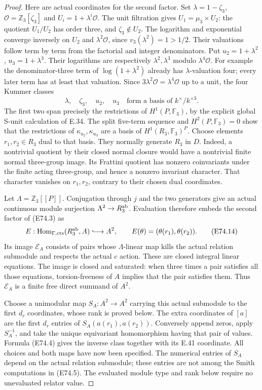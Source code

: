 \begin{proof}
Here are actual coordinates for the second factor.
Set $\lambda=1-\zeta_3$, $\mathcal O=\mathbb Z_3[\zeta_3]$
and $U_i=1+\lambda^i\mathcal O$. The unit filtration gives
$U_1=\mu_3\times U_2$: the quotient $U_1/U_2$ has order
three, and $\zeta_3\notin U_2$. The logarithm and
exponential converge inversely on $U_2$ and
$\lambda^2\mathcal O$, since $v_3(\lambda^2)=1>1/2$.
Their valuations follow term by term from the factorial
and integer denominators. Put $u_2=1+\lambda^2$,
$u_3=1+\lambda^3$. Their logarithms are respectively
$\lambda^2,\lambda^3$ modulo $\lambda^4\mathcal O$.
For example the denominator-three term of
$\log(1+\lambda^2)$ already has $\lambda$-valuation
four; every later term has at least that valuation.
Since $3\lambda^2\mathcal O=\lambda^4\mathcal O$ up
to a unit, the four Kummer classes
\[
 \lambda,\quad\zeta_3,\quad u_2,\quad u_3
 \quad\text{form a basis of }k^\times/k^{\times3}.
 \tag{E74.13}
\]
The first two span precisely the restrictions of
$H^1(P,\mathbb F_3)$, by the explicit global S-unit
calculation of E.34. The split five-term sequence and
$H^2(P,\mathbb F_3)=0$ show that the restrictions of
$\kappa_{u_2},\kappa_{u_3}$ are a basis of
$H^1(R_3,\mathbb F_3)^P$. Choose elements $r_1,r_2\in R_3$
dual to that basis. They normally generate $R_3$ in $D$.
Indeed, a nontrivial quotient by their closed normal
closure would have a nontrivial finite normal three-group
image. Its Frattini quotient has nonzero coinvariants
under the finite acting three-group, and hence a nonzero
invariant character. That character vanishes on $r_1,r_2$,
contrary to their chosen dual coordinates.

Let $\Lambda=\mathbb Z_3[[P]]$. Conjugation through $j$
and the two generators give an actual continuous module
surjection $\Lambda^2\to R_3^{\rm ab}$. Evaluation
therefore embeds the second factor of (E74.3) as
\[
 E:\operatorname{Hom}_{\Gamma,\rm cts}(R_3^{\rm ab},A)
       \lhook\joinrel\longrightarrow A^2,
 \qquad E(\theta)=(\theta(r_1),\theta(r_2)).
 \tag{E74.14}
\]
Its image $\mathcal E_A$ consists of pairs whose
$\Lambda$-linear map kills the actual relation submodule
and respects the actual $c$ action. These are closed
integral linear equations. The image is closed and
saturated: when three times a pair satisfies all those
equations, torsion-freeness of $A$ implies that the pair
satisfies them. Thus $\mathcal E_A$ is a finite free
direct summand of $A^2$.

Choose a unimodular map $S_A:A^2\to A^2$ carrying this
actual submodule to the first $d_r$ coordinates, whose
rank is proved below. The extra coordinates of $[a]$
are the first $d_r$ entries of
$S_A(a(r_1),a(r_2))$. Conversely append zeros, apply
$S_A^{-1}$, and take the unique equivariant homomorphism
having that pair of values. Formula (E74.4) gives the
inverse class together with its E.41 coordinate.
All choices and both maps have now been specified.
The numerical entries of $S_A$ depend on the actual
relation submodule; these entries are not among the
Smith computations in (E74.5). The evaluated module
type and rank below require no unevaluated relator value.


\end{proof}
